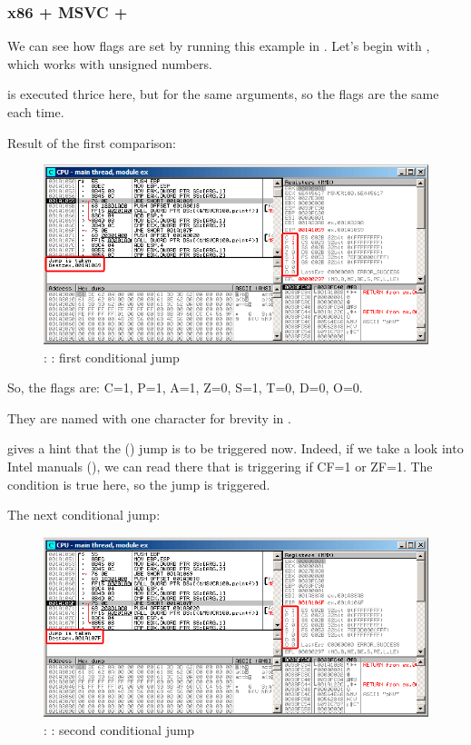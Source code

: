 \clearpage
\subsubsection{x86 + MSVC + \olly}
\myindex{\olly}

We can see how flags are set by running this example in \olly.
Let's begin with , which works with unsigned numbers.

\CMP is executed thrice here, but for the same arguments, so the flags are the same each time.

Result of the first comparison:

\begin{figure}[H]
\centering
\includegraphics[scale=\FigScale]{patterns/07_jcc/simple/olly_unsigned1.png}
\caption{\olly: : first conditional jump}
\label{fig:jcc_olly_unsigned_1}
\end{figure}

So, the flags are: C=1, P=1, A=1, Z=0, S=1, T=0, D=0, O=0.

They are named with one character for brevity in \olly.

\olly gives a hint that the (\JBE) jump is to be triggered now.
Indeed, if we take a look into Intel manuals (), 
we can read there that \JBE is triggering if CF=1 or ZF=1.
The condition is true here, so the jump is triggered.

\clearpage
The next conditional jump:

\begin{figure}[H]
\centering
\includegraphics[scale=\FigScale]{patterns/07_jcc/simple/olly_unsigned2.png}
\caption{\olly: : second conditional jump}
\label{fig:jcc_olly_unsigned_2}
\end{figure}

